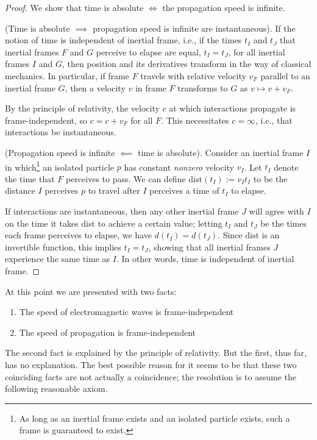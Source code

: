 \documentclass{article}
\begin{document}
\begin{proof}
	We show that time is absolute $\iff$ the propagation speed is infinite.
	
	(Time is absolute $\implies$ propagation speed is infinite are instantaneous). If the notion of time is independent of inertial frame, i.e., if the times $t_I$ and $t_J$ that inertial frames $F$ and $G$ perceive to elapse are equal, $t_I = t_J$, for all inertial frames $I$ and $G$, then position and its derivatives transform in the way of classical mechanics. In particular, if frame $F$ travels with relative velocity $v_F$ parallel to an inertial frame $G$, then a velocity $v$ in frame $F$ transforms to $G$ as $v \mapsto v + v_F$.
	
	By the principle of relativity, the velocity $c$ at which interactions propagate is frame-independent, so $c = c + v_F$ for all $F$. This necessitates $c = \infty$, i.e., that interactions be instantaneous.
	
	(Propagation speed is infinite $\impliedby$ time is absolute). Consider an inertial frame $I$ in which\footnote{As long as an inertial frame exists and an isolated particle exists, such a frame is guaranteed to exist.} an isolated particle $p$ has constant \textit{nonzero} velocity $v_I$. Let $t_I$ denote the time that $F$ perceives to pass. We can define $\text{dist}(t_I) := v_I t_I$ to be the distance $I$ perceives $p$ to travel after $I$ perceives a time of $t_I$ to elapse.
	
	If interactions are instantaneous, then any other inertial frame $J$ will agree with $I$ on the time it takes $\text{dist}$ to achieve a certain value; letting $t_I$ and $t_J$ be the times each frame perceives to elapse, we have $d(t_I) = d(t_J)$. Since $\text{dist}$ is an invertible function, this implies $t_I = t_J$, showing that all inertial frames $J$ experience the same time as $I$. In other words, time is independent of inertial frame.
\end{proof}

At this point we are presented with two facts:

\begin{enumerate}
	\item The speed of electromagnetic waves is frame-independent
	\item The speed of propagation is frame-independent
\end{enumerate}

The second fact is explained by the principle of relativity. But the first, thus far, has no explanation. The best possible reason for it seems to be that these two coinciding facts are not actually a coincidence; the resolution is to assume the following reasonable axiom.
\end{document}
